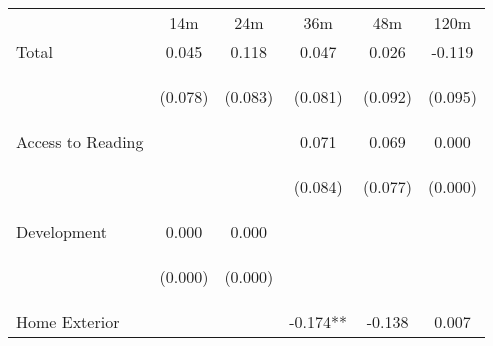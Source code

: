 \begin{tabular}{lccccc}
\hline \noalign{\smallskip} & 14m & 24m & 36m & 48m & 120m\\
\noalign{\smallskip}\hline \noalign{\smallskip}Total & 0.045 & 0.118 & 0.047 & 0.026 & -0.119\\
 & \begin{footnotesize}(0.078)\end{footnotesize} & \begin{footnotesize}(0.083)\end{footnotesize} & \begin{footnotesize}(0.081)\end{footnotesize} & \begin{footnotesize}(0.092)\end{footnotesize} & \begin{footnotesize}(0.095)\end{footnotesize}\\
\noalign{\smallskip}Access to Reading &  &  & 0.071 & 0.069 & 0.000\\
 & \begin{footnotesize}\end{footnotesize} & \begin{footnotesize}\end{footnotesize} & \begin{footnotesize}(0.084)\end{footnotesize} & \begin{footnotesize}(0.077)\end{footnotesize} & \begin{footnotesize}(0.000)\end{footnotesize}\\
\noalign{\smallskip}Development & 0.000 & 0.000 &  &  & \\
 & \begin{footnotesize}(0.000)\end{footnotesize} & \begin{footnotesize}(0.000)\end{footnotesize} & \begin{footnotesize}\end{footnotesize} & \begin{footnotesize}\end{footnotesize} & \begin{footnotesize}\end{footnotesize}\\
\noalign{\smallskip}Home Exterior &  &  & -0.174** & -0.138 & 0.007\\

\end{tabular}
